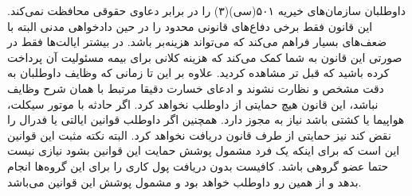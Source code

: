 \begin{itemize}
داوطلبان سازمان‌های خیریه ۵۰۱(سی)(۳) را در برابر دعاوی حقوقی محافظت نمی‌کند.
این قانون فقط برخی دفاع‌های قانونی محدود را در حین دادخواهی مدنی البته با ضعف‌های بسیار
فراهم می‌کند که می‌تواند هزینه‌بر باشد. در بیشتر ایالت‌ها فقط در صورتی این قانون به شما کمک می‌کند
که هزینه کلانی برای بیمه مسئولیت آن پرداخت کرده باشید که قبل تر مشاهده کردید. 
علاوه بر این تا زمانی که وظایف داوطلبان به دقت مشخص و نظارت نشوند و ادعای خسارت دقیقا مرتبط
با همان شرح وظایف نباشد، این قانون هیچ حمایتی از داوطلب نخواهد کرد.  اگر حادثه با موتور سیکلت،
هواپیما یا کشتی باشد نیاز به مجوز دارد. همچنین اگر داوطلب قوانین ایالتی یا فدرال را نقض کند نیز
حمایتی از طرف قانون دریافت نخواهد کرد.
البته نکته مثبت این قوانین این است که برای اینکه یک فرد مشمول پوشش حمایت این قوانین بشود
نیازی نیست حتما عضو گروهی باشد. کافیست بدون دریافت پول کاری را برای این گروه‌ها انجام بدهد
و از همین رو داوطلب خواهد بود و مشمول پوشش این قوانین می‌باشد.
\end{itemize}

